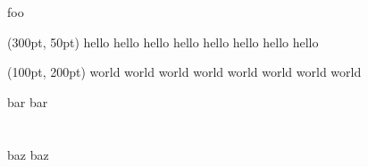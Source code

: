 \documentclass[unicode, 12pt]{beamer}
\title{}
\author{`git config user.name`}
\date{\today}
\begin{document}
\maketitle

\section{}

\begin{frame}{foo}
    \begin{textblock*}{50pt}(300pt, 50pt)
        hello hello hello hello hello hello hello hello
    \end{textblock*}
    \begin{textblock*}{100pt}(100pt, 200pt)
        world world world world world world world world
    \end{textblock*}
\end{frame}

\begin{frame}{bar}
    bar
\end{frame}

\section{}

\begin{frame}{baz}
    baz
\end{frame}
\end{document}
